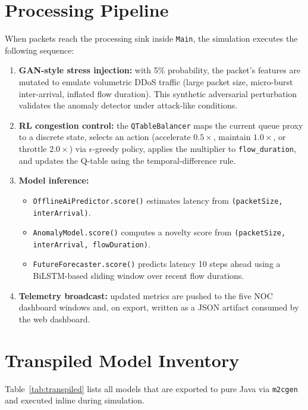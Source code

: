 \section{Processing Pipeline}

When packets reach the processing sink inside \texttt{Main}, the simulation executes the following sequence:
\begin{enumerate}
    \item \textbf{GAN-style stress injection:} with 5\% probability, the packet's features are mutated to emulate volumetric DDoS traffic (large packet size, micro-burst inter-arrival, inflated flow duration). This synthetic adversarial perturbation validates the anomaly detector under attack-like conditions.
    \item \textbf{RL congestion control:} the \texttt{QTableBalancer} maps the current queue proxy to a discrete state, selects an action (accelerate $0.5\times$, maintain $1.0\times$, or throttle $2.0\times$) via $\epsilon$-greedy policy, applies the multiplier to \texttt{flow\_duration}, and updates the Q-table using the temporal-difference rule.
    \item \textbf{Model inference:}
    \begin{itemize}
        \item \texttt{OfflineAiPredictor.score()} estimates latency from \texttt{(packetSize, interArrival)}.
        \item \texttt{AnomalyModel.score()} computes a novelty score from \texttt{(packetSize, interArrival, flowDuration)}.
        \item \texttt{FutureForecaster.score()} predicts latency 10 steps ahead using a BiLSTM-based sliding window over recent flow durations.
    \end{itemize}
    \item \textbf{Telemetry broadcast:} updated metrics are pushed to the five NOC dashboard windows and, on export, written as a JSON artifact consumed by the web dashboard.
\end{enumerate}

\section{Transpiled Model Inventory}

Table~\ref{tab:transpiled} lists all models that are exported to pure Java via \texttt{m2cgen} and executed inline during simulation.

